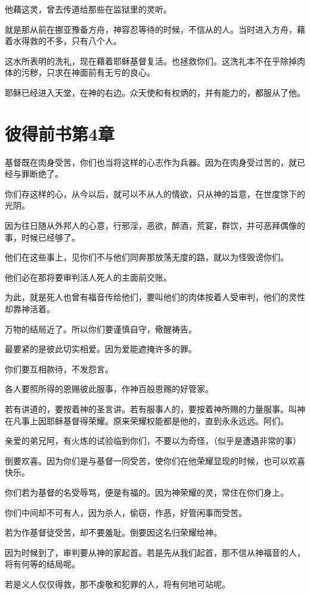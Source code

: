 \documentclass[12pt,oneside]{book}
\begin{document}
他藉这灵，曾去传道给那些在监狱里的灵听。

就是那从前在挪亚豫备方舟，神容忍等待的时候，不信从的人。当时进入方舟，藉着水得救的不多，只有八个人。

这水所表明的洗礼，现在藉着耶稣基督复活。也拯救你们。这洗礼本不在乎除掉肉体的污秽，只求在神面前有无亏的良心。

耶稣已经进入天堂，在神的右边。众天使和有权炳的，并有能力的，都服从了他。

\chapter{彼得前书第4章}
基督既在肉身受苦，你们也当将这样的心志作为兵器。因为在肉身受过苦的，就已经与罪断绝了。

你们存这样的心，从今以后，就可以不从人的情欲，只从神的旨意，在世度馀下的光阴。

因为往日随从外邦人的心意，行邪淫，恶欲，醉酒，荒宴，群饮，并可恶拜偶像的事，时候已经够了。

他们在这些事上，见你们不与他们同奔那放荡无度的路，就以为怪毁谤你们。

他们必在那将要审判活人死人的主面前交账。

为此，就是死人也曾有福音传给他们，要叫他们的肉体按着人受审判，他们的灵性却靠神活着。

万物的结局近了。所以你们要谨慎自守，儆醒祷告。

最要紧的是彼此切实相爱。因为爱能遮掩许多的罪。

你们要互相款待，不发怨言。

各人要照所得的恩赐彼此服事，作神百般恩赐的好管家。

若有讲道的，要按着神的圣言讲。若有服事人的，要按着神所赐的力量服事。叫神在凡事上因耶稣基督得荣耀。原来荣耀权能都是他的，直到永永远远。阿们。

亲爱的弟兄阿，有火炼的试验临到你们，不要以为奇怪，（似乎是遭遇非常的事）

倒要欢喜。因为你们是与基督一同受苦，使你们在他荣耀显现的时候，也可以欢喜快乐。

你们若为基督的名受辱骂，便是有福的。因为神荣耀的灵，常住在你们身上。

你们中间却不可有人，因为杀人，偷窃，作恶，好管闲事而受苦。

若为作基督徒受苦，却不要羞耻。倒要因这名归荣耀给神。

因为时候到了，审判要从神的家起首。若是先从我们起首，那不信从神福音的人，将有何等的结局呢。

若是义人仅仅得救，那不虔敬和犯罪的人，将有何地可站呢。
\end{document}
